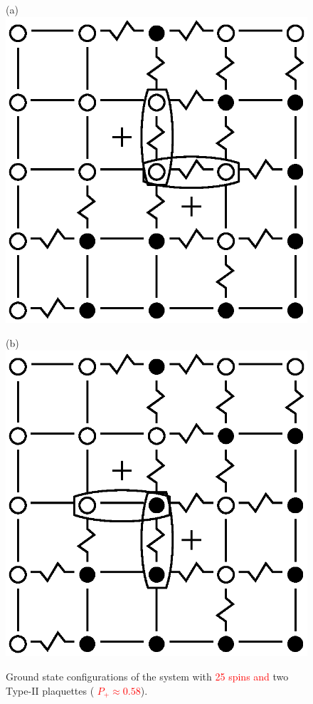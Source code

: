 \documentclass[preprint,12pt]{elsarticle}
\begin{document}
	\begin{figure}[H]
		\centering
		\begin{minipage}[h]{0.25\linewidth}
			\centering(a)
			\includegraphics[width=1\linewidth]{pictures/Cl5x5_Type2_gs1.eps}
		\end{minipage}
		\hspace{15pt}
		\begin{minipage}[h]{0.25\linewidth}
			\centering(b)
			\includegraphics[width=1\linewidth]{pictures/Cl5x5_Type2_gs2.eps}
		\end{minipage}
		\caption{Ground state configurations of the system with \textcolor{red}{25 spins and} two Type-II plaquettes (\textcolor{red}{  $P_+\approx0.58$}).}
		\label{fig:5x5.22F}
	\end{figure}
	
\end{document}
